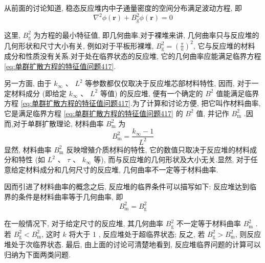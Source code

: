 \documentclass{Sichuan Normal University}
\begin{document}
    从前面的讨论知道, 稳态反应堆内中子通量密度的空间分布满足波动方程, 即
    \begin{equation}
\nabla^2 \phi(\boldsymbol{r})+B_{\mathrm{g}}^2 \phi(\boldsymbol{r})=0
\end{equation}

这里, $B_{\mathrm{g}}^2$ 为方程的最小特征值, 即几何曲率.对于裸堆来讲, 几何曲率只与反应堆的几何形状和尺寸大小有关, 例如对于平板形裸堆, $B_{\mathrm{g}}^2=\left(\frac{\pi}{a}\right)^2$, 它与反应堆的材料成分和性质没有关系.对于处在临界状态的反应堆, 它的几何曲率应能满足临界方程 \eqref{eq:单群扩散方程的特征值问题417}.

另一方面, 由于 $k_{\infty}$ 、 $L^2$ 等参数都仅仅取决于反应堆芯部材料特性, 因而, 对于一定材料成分 (即给定 $k_{\infty}$ 、 $L^2$ 等值) 的反应堆, 便有一个确定的 $B^2$ 值能满足临界方程 \eqref{eq:单群扩散方程的特征值问题417}.为了计算和讨论方便, 把它叫作材料曲率, 它是满足临界方程 \eqref{eq:单群扩散方程的特征值问题417} 的 $B^2$ 值, 并记作 $B_{\mathrm{m}}^2$ .因而,对于单群扩散理论, 材料曲率 $B_{\mathrm{m}}^2$ 为
\begin{equation}
B_{\mathrm{m}}^2=\frac{k_{\infty}-1}{L^2}
\end{equation}
显然, 材料曲率 $B_{\mathrm{m}}^2$ 反映增殖介质材料的特性, 它的数值只取决于反应堆的材料成分和特性 (如 $L^2$ 、 $\tau$ 、 $k_{\infty}$ 等), 而与反应堆的几何形状及大小无关.显然, 对于任意给定材料成分和几何尺寸的反应堆, 几何曲率不一定等于材料曲率.

因而引进了材料曲率的概念之后, 反应堆的临界条件可以描写如下: 反应堆达到临界的条件是材料曲率等于几何曲率, 即
\begin{equation}
B_{\mathrm{m}}^2=B_{\mathrm{g}}^2
\label{eq:单群扩散方程的特征值问题443}
\end{equation}



在一般情况下, 对于给定尺寸的反应堆, 其几何曲率 $B_{\mathrm{g}}^2$ 不一定等于材料曲率 $B_{\mathrm{m}}^2$ .若 $B_{\mathrm{g}}^2<B_{\mathrm{m}}^2$, 这时 $k$ 将大于 1 , 反应堆处于超临界状态; 反之, 若 $B_{\mathrm{g}}^2>B_{\mathrm{m}}^2$, 则反应堆处于次临界状态.
最后, 由上面的讨论可清楚地看到, 反应堆临界问题的计算可以归纳为下面两类问题.
\end{document}
